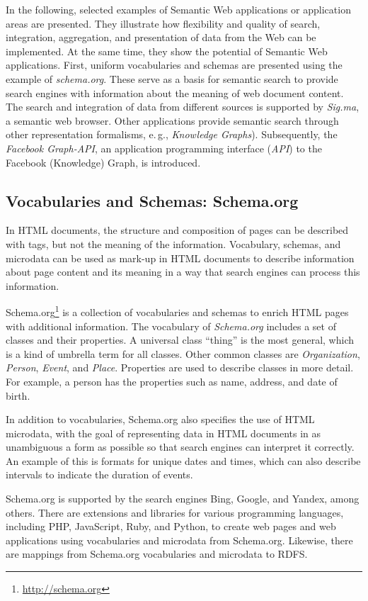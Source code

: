 \documentclass[a4paper,USenglish]{tgdk-v2021}
\newcommand{\myurl}[1]{\footnote{\url{#1}}}
\begin{document}
In the following, selected examples of Semantic Web applications or application areas are presented. 
They illustrate how flexibility and quality of search, integration, aggregation, and presentation of data from the Web can be implemented. 
At the same time, they show the potential of Semantic Web applications.
First, uniform vocabularies and schemas are presented using the example of \textit{schema.org}.
These serve as a basis for semantic search to provide search engines with information about the meaning of web document content.
The search and integration of data from different sources is supported by \textit{Sig.ma}, a semantic web browser.
Other applications provide semantic search through other representation formalisms, e.\,g., \textit{Knowledge Graphs}).
Subsequently, the \textit{Facebook Graph-API}, an application programming interface (\textit{API}) to the Facebook (Knowledge) Graph, is introduced.

\subsection{Vocabularies and Schemas: Schema.org}

In HTML documents, the structure and composition of pages can be described with tags, but not the meaning of the information.
Vocabulary, schemas, and microdata can be used as mark-up in HTML documents to describe information about page content and its meaning in a way that search engines can process this information.

Schema.org\myurl{http://schema.org} is a collection of vocabularies and schemas to enrich HTML pages with additional information.
The vocabulary of \textit{Schema.org} includes a set of classes and their properties. A universal class ``thing'' is the most general, which is a kind of umbrella term for all classes.  
Other common classes are \textit{Organization}, \textit{Person}, \textit{Event}, and \textit{Place}.
Properties are used to describe classes in more detail.
For example, a person has the properties such as name, address, and date of birth.

In addition to vocabularies, Schema.org also specifies the use of HTML microdata, with the goal of representing data in HTML documents in as unambiguous a form as possible so that search engines can interpret it correctly.
An example of this is formats for unique dates and times, which can also describe intervals to indicate the duration of events.

Schema.org is supported by the search engines Bing, Google, and Yandex, among others.
There are extensions and libraries for various programming languages, including PHP, JavaScript, Ruby, and Python, to create web pages and web applications using vocabularies and microdata from Schema.org. 
Likewise, there are mappings from Schema.org vocabularies and microdata to RDFS.
\end{document}

